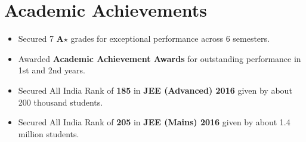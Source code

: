 \section*{Academic Achievements}
\begin{itemize}

\setlength\itemsep{0pt}
\item Secured 7 \textbf{A$\star$} grades for exceptional performance across 6 semesters.
\item Awarded \textbf{Academic Achievement Awards} for outstanding performance in 1st and 2nd years.
\item Secured All India Rank of {\bf 185} in {\bf JEE (Advanced) 2016} given by about 200 thousand students.
\item Secured All India Rank of {\bf 205} in {\bf JEE (Mains) 2016} given by about 1.4 million students.

\end{itemize}
